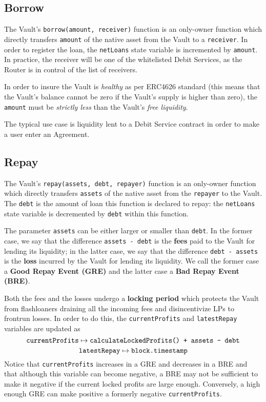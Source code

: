 \documentclass[a4paper,10 pt]{article}
\theoremstyle{definition}
\begin{document}
\subsection{Borrow}\label{borrowSub}

The Vault's \verb|borrow(amount, receiver)| function is an only-owner function which directly transfers \verb|amount| of the native asset from the Vault to a \verb|receiver|. In order to register the loan, the \verb|netLoans| state variable is incremented by \verb|amount|. In practice, the receiver will be one of the whitelisted Debit Services, as the Router is in control of the list of receivers.

In order to insure the Vault is {\it healthy} as per ERC4626 standard (this means that the Vault's balance cannot be zero if the Vault's supply is higher than zero),  the \verb|amount| must be {\it strictly less} than the Vault's {\it free liquidity}.

The typical use case is liquidity lent to a Debit Service contract in order to make a user enter an Agreement.

\subsection{Repay}\label{repaySub}

The Vault's \verb|repay(assets, debt, repayer)| function is an only-owner function which directly transfers \verb|assets| of the native asset from the \verb|repayer| to the Vault. The \verb|debt| is the amount of loan this function is declared to repay: the \verb|netLoans| state variable is decremented by \verb|debt| within this function.

The parameter \verb|assets| can be either larger or smaller than \verb|debt|. In the former case, we say that the difference \verb|assets - debt| is the {\bf fees} paid to the Vault for lending its liquidity; in the latter case, we say that the difference \verb|debt - assets| is the {\bf loss} incurred by the Vault for lending its liquidity. We call the former case a {\bf Good Repay Event (GRE)} and the latter case a {\bf Bad Repay Event (BRE)}. 

Both the fees and the losses undergo a {\bf locking period} which protects the Vault from flashloaners draining all the incoming fees and disincentivize LPs to frontrun losses. In order to do this, the \verb|currentProfits| and \verb|latestRepay| variables are updated as 
$$\verb|currentProfits| \mapsto \verb|calculateLockedProfits() + assets - debt|$$ 
$$\verb|latestRepay| \mapsto \verb|block.timestamp|$$ 
Notice that \verb|currentProfits| increases in a GRE and decreases in a BRE and that although this variable can become negative, a BRE may not be sufficient to make it negative if the current locked profits are large enough. Conversely, a high enough GRE can make positive a formerly negative \verb|currentProfits|.
\end{document}
